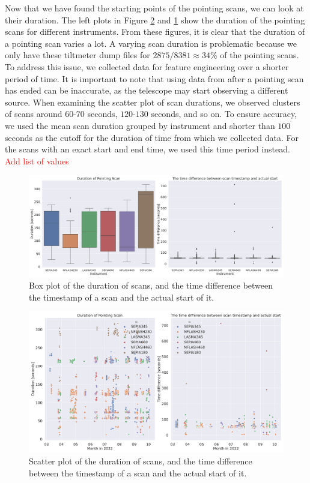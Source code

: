 Now that we have found the starting points of the pointing scans, we can look at their duration.
The left plots in Figure \ref{fig:scan_times_date} and \ref{fig:scan_times_box} show the duration of the pointing scans for different instruments.
From these figures, it is clear that the duration of a pointing scan varies a lot.
A varying scan duration is problematic because we only have these tiltmeter dump files for $2875/8381\approx 34\%$ of the pointing scans. 
To address this issue, we collected data for feature engineering over a shorter period of time.
It is important to note that using data from after a pointing scan has ended can be inaccurate, as the telescope may start observing a different source.
When examining the scatter plot of scan durations, we observed clusters of scans around $60$-$70$ seconds, $120$-$130$ seconds, and so on.
To ensure accuracy, we used the mean scan duration grouped by instrument and shorter than $100$ seconds as the cutoff for the duration of time from which we collected data.
For the scans with an exact start and end time, we used this time period instead.
\textcolor{red}{Add list of values}


\begin{figure}[H]
    \centering
    \includegraphics[width=1.1\textwidth]{Tiltmeter plots/scan_duration_distribution_rx.pdf}
    \caption{Box plot of the duration of scans, and the time difference between the timestamp of a scan and the actual start of it.}
    \label{fig:scan_times_box}
\end{figure}

\begin{figure}[H]
    \centering
    \includegraphics[width=1.1\textwidth]{Tiltmeter plots/scan_duration_distribution_date.pdf}
    \caption{Scatter plot of the duration of scans, and the time difference between the timestamp of a scan and the actual start of it.}
    \label{fig:scan_times_date}
\end{figure}




